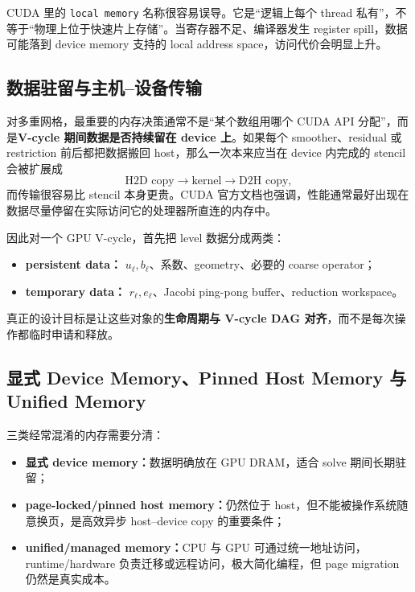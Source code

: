 \begin{warningbox}
CUDA 里的 \texttt{local memory} 名称很容易误导。它是“逻辑上每个 thread 私有”，不等于“物理上位于快速片上存储”。当寄存器不足、编译器发生 register spill，数据可能落到 device memory 支持的 local address space，访问代价会明显上升。
\end{warningbox}

\subsection{数据驻留与主机--设备传输}

对多重网格，最重要的内存决策通常不是“某个数组用哪个 CUDA API 分配”，而是\textbf{V-cycle 期间数据是否持续留在 device 上}。如果每个 smoother、residual 或 restriction 前后都把数据搬回 host，那么一次本来应当在 device 内完成的 stencil 会被扩展成
\[
\text{H2D copy}
\rightarrow
\text{kernel}
\rightarrow
\text{D2H copy},
\]
而传输很容易比 stencil 本身更贵。CUDA 官方文档也强调，性能通常最好出现在数据尽量停留在实际访问它的处理器所直连的内存中\cite{cudaProgramming2026}。

因此对一个 GPU V-cycle，首先把 level 数据分成两类：
\begin{itemize}
\item \textbf{persistent data：} $u_\ell,b_\ell$、系数、geometry、必要的 coarse operator；
\item \textbf{temporary data：} $r_\ell,e_\ell$、Jacobi ping-pong buffer、reduction workspace。
\end{itemize}
真正的设计目标是让这些对象的\textbf{生命周期与 V-cycle DAG 对齐}，而不是每次操作都临时申请和释放。

\subsection{显式 Device Memory、Pinned Host Memory 与 Unified Memory}

三类经常混淆的内存需要分清：

\begin{itemize}
\item \textbf{显式 device memory：}数据明确放在 GPU DRAM，适合 solve 期间长期驻留；
\item \textbf{page-locked/pinned host memory：}仍然位于 host，但不能被操作系统随意换页，是高效异步 host--device copy 的重要条件；
\item \textbf{unified/managed memory：}CPU 与 GPU 可通过统一地址访问，runtime/hardware 负责迁移或远程访问，极大简化编程，但 page migration 仍然是真实成本。
\end{itemize}

